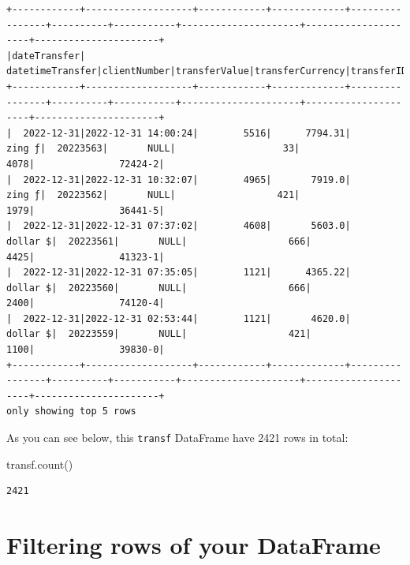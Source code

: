 \documentclass[
  11pt,
  letterpaper,
  DIV=11,
  numbers=noendperiod]{scrreprt}
\newenvironment{Shaded}{\begin{snugshade}}{\end{snugshade}}
\newcommand{\NormalTok}[1]{\textcolor[rgb]{0.00,0.23,0.31}{#1}}
\begin{document}
\begin{verbatim}
+------------+-------------------+------------+-------------+----------------+----------+-----------+---------------------+---------------------+----------------------+
|dateTransfer|   datetimeTransfer|clientNumber|transferValue|transferCurrency|transferID|transferLog|destinationBankNumber|destinationBankBranch|destinationBankAccount|
+------------+-------------------+------------+-------------+----------------+----------+-----------+---------------------+---------------------+----------------------+
|  2022-12-31|2022-12-31 14:00:24|        5516|      7794.31|          zing ƒ|  20223563|       NULL|                   33|                 4078|               72424-2|
|  2022-12-31|2022-12-31 10:32:07|        4965|       7919.0|          zing ƒ|  20223562|       NULL|                  421|                 1979|               36441-5|
|  2022-12-31|2022-12-31 07:37:02|        4608|       5603.0|        dollar $|  20223561|       NULL|                  666|                 4425|               41323-1|
|  2022-12-31|2022-12-31 07:35:05|        1121|      4365.22|        dollar $|  20223560|       NULL|                  666|                 2400|               74120-4|
|  2022-12-31|2022-12-31 02:53:44|        1121|       4620.0|        dollar $|  20223559|       NULL|                  421|                 1100|               39830-0|
+------------+-------------------+------------+-------------+----------------+----------+-----------+---------------------+---------------------+----------------------+
only showing top 5 rows
\end{verbatim}

As you can see below, this \texttt{transf} DataFrame have 2421 rows in
total:

\begin{Shaded}
\begin{Highlighting}[]
\NormalTok{transf.count()}
\end{Highlighting}
\end{Shaded}

\begin{verbatim}
2421
\end{verbatim}

\hypertarget{filtering-rows-of-your-dataframe}{%
\section{Filtering rows of your
DataFrame}\label{filtering-rows-of-your-dataframe}}
\end{document}
